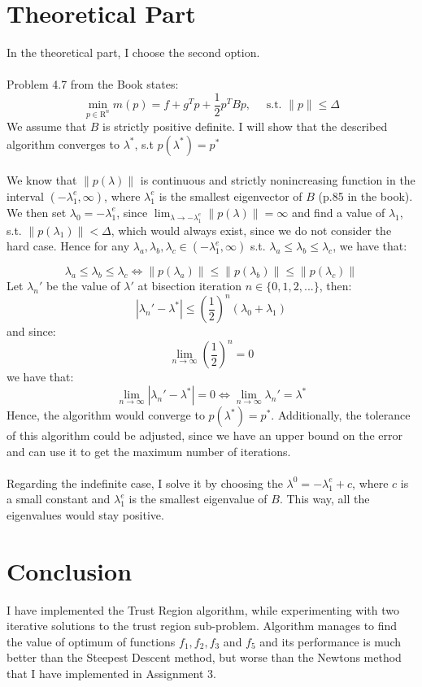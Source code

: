 \documentclass[a4paper]{article}
\begin{document}
\section{Theoretical Part}
\label{sec:theory}
In the theoretical part, I choose the second option. \\\\
Problem 4.7 from the Book states:
\[
\min _{p \in \mathrm{R}^{n}} m(p)=f+g^{T} p+\frac{1}{2} p^{T} B p, \quad \text { s.t. }\|p\| \leq \Delta
\]
We assume that $B$ is strictly positive definite. I
will show that the described algorithm converges to $\lambda^*$, s.t
$p(\lambda^*) = p^*$\\\\
We know that $\| p(\lambda) \|$ is continuous and
strictly nonincreasing function in the interval $(-\lambda^e_1, \infty)$, where
$\lambda_1^e$ is the smallest eigenvector of $B$
(p.85 in the book). We then set $\lambda_0 = -\lambda^e_1$, since
$\lim_{\lambda \to -\lambda^e_1} \| p(\lambda) \| = \infty$
and find a value of $\lambda_1$, s.t. $\| p(\lambda_1) \| < \Delta$, which would
always exist, since we do not consider the hard case.
Hence for any $\lambda_a, \lambda_b, \lambda_c \in (-\lambda^e_1, \infty)$ s.t.
$\lambda_a \leq \lambda_b \leq \lambda_c$, we have that:

\[
\lambda_a \leq \lambda_b \leq \lambda_c \Leftrightarrow
\|p(\lambda_a)\| \leq \|p(\lambda_b)\| \leq \|p(\lambda_c)\| 
\]
Let $\lambda_n'$ be the value of $\lambda'$ at bisection iteration
$n \in \{0,1,2,...\}$, then:
\[
|\lambda_n' - \lambda^*| \leq
\left(\frac{1}{2}\right)^n (\lambda_0 + \lambda_1)
\]
and since:
\[
\lim_{n \to \infty} \left(\frac{1}{2}\right)^n = 0
\]
we have that:
\[
\lim_{n \to \infty} | \lambda_n' - \lambda^*| = 0 \Leftrightarrow
\lim_{n \to \infty} \lambda_n' = \lambda^*
\]
Hence, the algorithm would converge to $p(\lambda^*) = p^*$. Additionally, the
tolerance of this algorithm could be adjusted, since we have an
upper bound on the error and can use it to get the maximum number of iterations.\\\\
Regarding the indefinite case, I solve it by choosing the
$\lambda^{0}= -\lambda_1^e + c$, where $c$ is a small
constant and $\lambda_1^e$ is the smallest eigenvalue of $B$. This way, all the
eigenvalues would stay positive.

\section{Conclusion}
I have implemented the Trust Region algorithm, while experimenting with two
iterative solutions to the trust region sub-problem.
Algorithm manages to find the value of optimum of functions $f_1, f_2, f_3$ and
$f_5$ and its performance is much better than the Steepest Descent method, but
worse than the Newtons method that I have implemented in Assignment 3.
\end{document}
